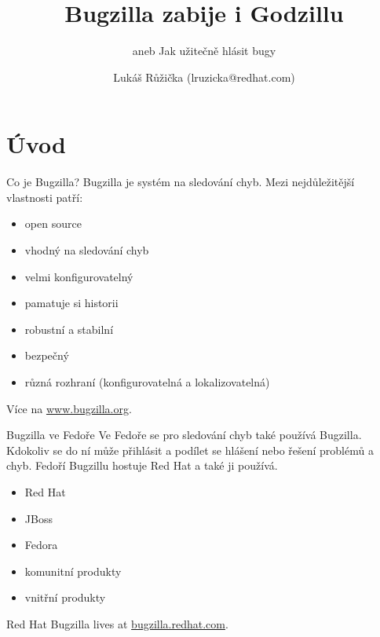 \documentclass[12pt,aspectratio=169]{beamer}
\begin{document}
	\author{Lukáš Růžička (lruzicka@redhat.com)}
	\title{Bugzilla zabije i Godzillu}
	\subtitle{aneb Jak užitečně hlásit bugy}
	\date{}

\begin{frame}[plain]
	\maketitle 
\end{frame}

\section{Úvod}

\begin{frame}{Co je Bugzilla?}
Bugzilla je systém na sledování chyb. Mezi nejdůležitější vlastnosti patří:

\begin{itemize}
\item open source
\item vhodný na sledování chyb
\item velmi konfigurovatelný
\item pamatuje si historii
\item robustní a stabilní
\item bezpečný
\item různá rozhraní (konfigurovatelná a lokalizovatelná)
\end{itemize}

Více na {\color{blue}\url{www.bugzilla.org}}.
\end{frame}

\begin{frame}{Bugzilla ve Fedoře}
Ve Fedoře se pro sledování chyb také používá Bugzilla. Kdokoliv se do ní může přihlásit a podílet se hlášení nebo řešení problémů a chyb. Fedoří Bugzillu hostuje Red Hat a také ji používá.

\begin{itemize}
	\item Red Hat
	\item JBoss
	\item Fedora
	\item komunitní produkty
	\item vnitřní produkty
\end{itemize}

Red Hat Bugzilla lives at {\color{red}\url{bugzilla.redhat.com}}.
\end{frame}
\end{document}
